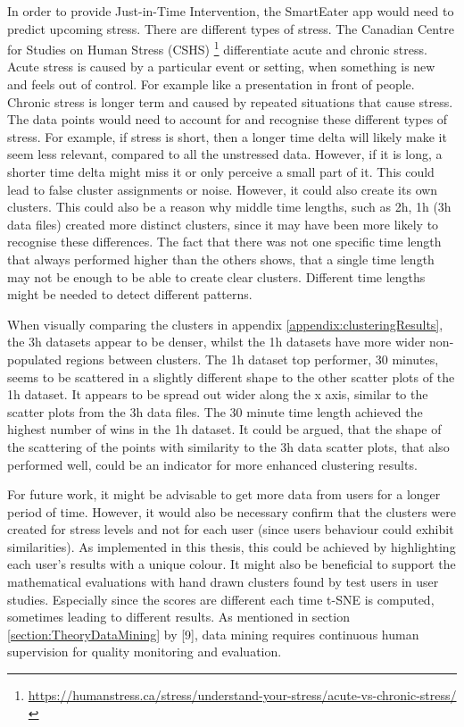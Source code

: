 In order to provide Just-in-Time Intervention, the SmartEater app would need to predict upcoming stress. There are different types of stress. The Canadian Centre for Studies on Human Stress (CSHS) \footnote{\url{https://humanstress.ca/stress/understand-your-stress/acute-vs-chronic-stress/}} differentiate acute and chronic stress. Acute stress is caused by a particular event or setting, when something is new and feels out of control. For example like a presentation in front of people. Chronic stress is longer term and caused by repeated situations that cause stress. The data points would need to account for and recognise these different types of stress. For example, if stress is short, then a longer time delta will likely make it seem less relevant, compared to all the unstressed data. However, if it is long, a shorter time delta might miss it or only perceive a small part of it. This could lead to false cluster assignments or noise. However, it could also create its own clusters. This could also be a reason why middle time lengths, such as 2h, 1h (3h data files) created more distinct clusters, since it may have been more likely to recognise these differences. The fact that there was not one specific time length that always performed higher than the others shows, that a single time length may not be enough to be able to create clear clusters. Different time lengths might be needed to detect different patterns.

When visually comparing the clusters in appendix \ref{appendix:clusteringResults}, the 3h datasets appear to be denser, whilst the 1h datasets have more wider non-populated regions between clusters. The 1h dataset top performer, 30 minutes, seems to be scattered in a slightly different shape to the other scatter plots of the 1h dataset. It appears to be spread out wider along the x axis, similar to the scatter plots from the 3h data files. The 30 minute time length achieved the highest number of wins in the 1h dataset. It could be argued, that the shape of the scattering of the points with similarity to the 3h data scatter plots, that also performed well, could be an indicator for more enhanced clustering results.


For future work, it might be advisable to get more data from users for a longer period of time. However, it would also be necessary confirm that the clusters were created for stress levels and not for each user (since users behaviour could exhibit similarities). As implemented in this thesis, this could be achieved by highlighting each user's results with a unique colour. It might also be beneficial to support the mathematical evaluations with hand drawn clusters found by test users in user studies. Especially since the scores are different each time t-SNE is computed, sometimes leading to different results. As mentioned in section \ref{section:TheoryDataMining} by \textcite{DataMiningAndPredictiveAnalytics}[9], data mining requires continuous human supervision for quality monitoring and evaluation.


